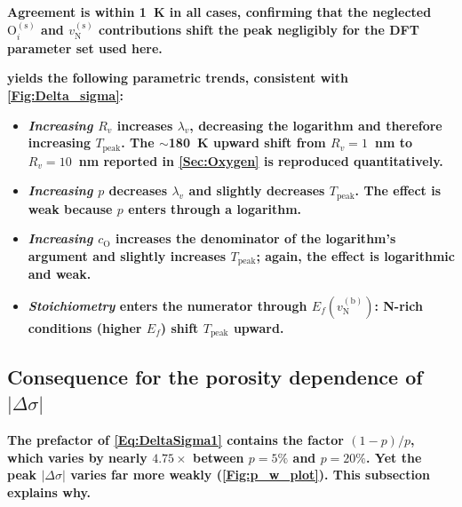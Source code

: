 \documentclass[preprint,12pt,sort&compress]{elsarticle}
\newcommand{\?}{\stackrel{?}{=}}
\providecommand{\DIFaddtex}[1]{{\bf #1}} %
\providecommand{\DIFadd}[1]{\texorpdfstring{\DIFaddtex{#1}}{#1}} %
\begin{document}
\DIFadd{Agreement is within 1~K in all cases, confirming that the neglected $\text{O}_i^{(\text{s})}$ and $v_\text{N}^{(\text{s})}$ contributions shift the peak negligibly for the DFT parameter set used here.
}

\DIFadd{ yields the following parametric trends, consistent with \cref{Fig:Delta_sigma}:
}\begin{itemize}
    \item \DIFadd{\textit{Increasing $R_v$} increases $\lambda_v$, decreasing the logarithm and therefore increasing $T_\text{peak}$. The $\sim$180~K upward shift from $R_v = 1$~nm to $R_v = 10$~nm reported in \cref{Sec:Oxygen} is reproduced quantitatively.
    }\item \DIFadd{\textit{Increasing $p$} decreases $\lambda_v$ and slightly decreases $T_\text{peak}$. The effect is weak because $p$ enters through a logarithm.
    }\item \DIFadd{\textit{Increasing $c_\mathrm{O}$} increases the denominator of the logarithm's argument and slightly increases $T_\text{peak}$; again, the effect is logarithmic and weak.
    }\item \DIFadd{\textit{Stoichiometry} enters the numerator through $E_f(v_\text{N}^{(\text{b})})$: N-rich conditions (higher $E_f$) shift $T_\text{peak}$ upward.
}\end{itemize}

\subsection{\DIFadd{Consequence for the porosity dependence of }\texorpdfstring{$|\Delta \sigma|$}{|Delta sigma|}}
\label{App:Tpeak:Porosity}

\DIFadd{The prefactor of \cref{Eq:DeltaSigma1} contains the factor $(1-p)/p$, which varies by nearly $4.75\times$ between $p = 5\%$ and $p = 20\%$. Yet the peak $|\Delta \sigma|$ varies far more weakly (\cref{Fig:p_w_plot}). This subsection explains why.
}
\end{document}

